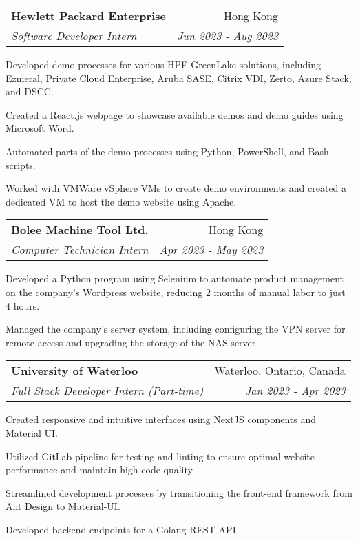 \documentclass[letterpaper,11pt]{article}
\makeatletter
\newcommand{\resumeItem}[2]{
  \item\small{
    #1{ #2 \vspace{2pt}}
  }
}
\newcommand{\resumeSubheading}[4]{
  \vspace{-2pt}\item
    \begin{tabular*}{0.97\textwidth}{l@{\extracolsep{\fill}}r}
      \textbf{#1} & #2 \\
      \textit{\small#3} & \textit{\small #4} \\
    \end{tabular*}\vspace{0pt}
}
\newcommand{\resumeItemListStart}{\begin{itemize}}
\newcommand{\resumeItemListEnd}{\end{itemize}\vspace{0pt}}
\makeatother
\begin{document}
\resumeSubheading
{Hewlett Packard Enterprise}{Hong Kong}
{Software Developer Intern}{Jun 2023 - Aug 2023}
\resumeItemListStart

\resumeItem{Developed demo processes for various HPE GreenLake solutions, including Ezmeral, Private Cloud Enterprise, Aruba SASE, Citrix VDI, Zerto, Azure Stack, and DSCC.}

\resumeItem{Created a React.js webpage to showcase available demos and demo guides using Microsoft Word.}

\resumeItem{Automated parts of the demo processes using Python, PowerShell, and Bash scripts.}

\resumeItem{Worked with VMWare vSphere VMs to create demo environments and created a dedicated VM to host the demo website using Apache.}

\resumeItemListEnd


\resumeSubheading
{Bolee Machine Tool Ltd.}{Hong Kong}
{Computer Technician Intern}{Apr 2023 - May 2023}
\resumeItemListStart
\resumeItem{
	Developed a Python program using Selenium to automate product management on the company’s Wordpress website, reducing 2 months of manual labor to just 4 hours.}

\resumeItem{Managed the company’s server system, including configuring the VPN server for remote access and upgrading the storage of the NAS server.
}

\resumeItemListEnd

\resumeSubheading
{University of Waterloo}{Waterloo, Ontario, Canada}
{Full Stack Developer Intern (Part-time)}{Jan 2023 - Apr 2023}
\resumeItemListStart

\resumeItem{Created responsive and intuitive interfaces using NextJS components and Material UI.}

\resumeItem{Utilized GitLab pipeline for testing and linting to ensure optimal website performance and maintain high code quality.}

\resumeItem{Streamlined development processes by transitioning the front-end framework from Ant Design to Material-UI.}

\resumeItem{Developed backend endpoints for a Golang REST API}

\resumeItemListEnd
\end{document}
